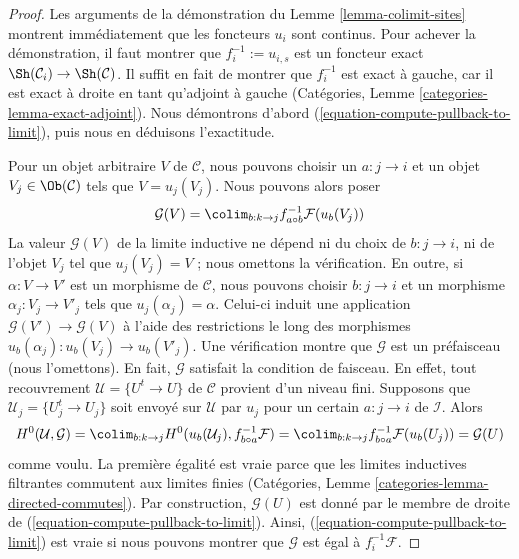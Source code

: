 \begin{proof}
Les arguments de la démonstration du Lemme \ref{lemma-colimit-sites}
montrent immédiatement que les foncteurs $u_i$ sont continus.
Pour achever la démonstration, il faut montrer que
$f_i^{-1} := u_{i, s}$ est un foncteur exact
$\Sh(\mathcal{C}_i) \to \Sh(\mathcal{C})$.
Il suffit en fait de montrer que $f_i^{-1}$ est exact à gauche,
car il est exact à droite en tant qu’adjoint à gauche
(Catégories, Lemme \ref{categories-lemma-exact-adjoint}).
Nous démontrons d’abord (\ref{equation-compute-pullback-to-limit}),
puis nous en déduisons l’exactitude.

\medskip\noindent
Pour un objet arbitraire $V$ de $\mathcal{C}$, nous pouvons choisir
un $a : j \to i$ et un objet $V_j \in \Ob(\mathcal{C})$ tels que
$V = u_j(V_j)$. Nous pouvons alors poser
$$
\mathcal{G}(V) = \colim_{b : k \to j} f_{a \circ b}^{-1}\mathcal{F}(u_b(V_j))
$$
La valeur $\mathcal{G}(V)$ de la limite inductive ne dépend ni du choix
de $b : j \to i$, ni de l’objet $V_j$ tel que $u_j(V_j) = V$ ;
nous omettons la vérification. En outre, si
$\alpha : V \to V'$ est un morphisme de $\mathcal{C}$, nous pouvons choisir
$b : j \to i$ et un morphisme $\alpha_j : V_j \to V'_j$ tels que
$u_j(\alpha_j) = \alpha$. Celui-ci induit une application
$\mathcal{G}(V') \to \mathcal{G}(V)$ à l’aide des restrictions le long des
morphismes $u_b(\alpha_j) : u_b(V_j) \to u_b(V'_j)$. Une vérification montre
que $\mathcal{G}$ est un préfaisceau (nous l’omettons).
En fait, $\mathcal{G}$ satisfait la condition de faisceau. En effet,
tout recouvrement $\mathcal{U} = \{U^t \to U\}$ de $\mathcal{C}$
provient d’un niveau fini. Supposons que
$\mathcal{U}_j = \{U^t_j \to U_j\}$ soit envoyé sur $\mathcal{U}$ par $u_j$
pour un certain $a : j \to i$ de $\mathcal{I}$. Alors
$$
H^0(\mathcal{U}, \mathcal{G}) =
\colim_{b : k \to j} H^0(u_b(\mathcal{U}_j), f_{b \circ a}^{-1}\mathcal{F}) =
\colim_{b : k \to j} f_{b \circ a}^{-1}\mathcal{F}(u_b(U_j)) =
\mathcal{G}(U)
$$
comme voulu. La première égalité est vraie parce que les limites inductives
filtrantes commutent aux limites finies
(Catégories, Lemme \ref{categories-lemma-directed-commutes}).
Par construction, $\mathcal{G}(U)$ est donné par le membre de droite de
(\ref{equation-compute-pullback-to-limit}).
Ainsi, (\ref{equation-compute-pullback-to-limit}) est vraie si nous pouvons
montrer que $\mathcal{G}$ est égal à $f_i^{-1}\mathcal{F}$.


\end{proof}

